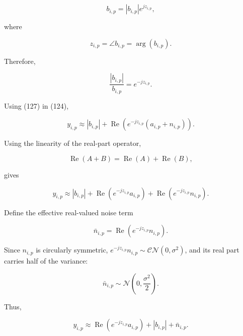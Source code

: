 \documentclass[12pt,a4paper]{article}
\begin{document}
\begin{equation}
b_{i,p}
=
|b_{i,p}|e^{jz_{i,p}},
\tag{125}
\end{equation}

where

\begin{equation}
z_{i,p}
=
\angle b_{i,p}
=
\arg(b_{i,p}).
\tag{126}
\end{equation}

Therefore,

\begin{equation}
\frac{|b_{i,p}|}{b_{i,p}}
=
e^{-jz_{i,p}}.
\tag{127}
\end{equation}

Using (127) in (124),

\begin{equation}
y_{i,p}
\approx
|b_{i,p}|
+
\operatorname{Re}
\left(
e^{-jz_{i,p}}
(a_{i,p}+n_{i,p})
\right).
\tag{128}
\end{equation}

Using the linearity of the real-part operator,

\begin{equation}
\operatorname{Re}(A+B)
=
\operatorname{Re}(A)
+
\operatorname{Re}(B),
\tag{129}
\end{equation}

gives

\begin{equation}
y_{i,p}
\approx
|b_{i,p}|
+
\operatorname{Re}
\left(
e^{-jz_{i,p}}a_{i,p}
\right)
+
\operatorname{Re}
\left(
e^{-jz_{i,p}}n_{i,p}
\right).
\tag{130}
\end{equation}

Define the effective real-valued noise term

\begin{equation}
\bar n_{i,p}
=
\operatorname{Re}
\left(
e^{-jz_{i,p}}n_{i,p}
\right).
\tag{131}
\end{equation}

Since $n_{i,p}$ is circularly symmetric, $e^{-jz_{i,p}}n_{i,p}\sim\mathcal{CN}(0,\sigma^2)$,
and its real part carries half of the variance:

\begin{equation}
\boxed{
\bar n_{i,p}
\sim
\mathcal{N}\!\left(0,\frac{\sigma^2}{2}\right)
}.
\tag{131a}
\end{equation}

Thus,

\begin{equation}
\boxed{
y_{i,p}
\approx
\operatorname{Re}
\left(
e^{-jz_{i,p}}a_{i,p}
\right)
+
|b_{i,p}|
+
\bar n_{i,p}
}.
\tag{132}
\end{equation}
\end{document}
